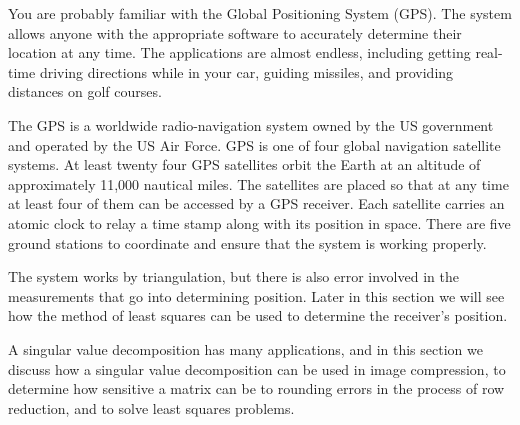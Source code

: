  \label{sec:pseudoinverses}

\vspace*{-17 pt}

\vspace*{13 pt}


You are probably familiar with the Global Positioning System (GPS). The system allows anyone with the appropriate software to accurately determine their location at any time. The applications are almost endless, including getting real-time driving directions while in your car, guiding missiles, and providing distances on golf courses. 

The GPS is a worldwide radio-navigation system owned by the US government and operated by the US Air Force. GPS is one of four global navigation satellite systems. At least twenty four GPS satellites orbit the Earth at an altitude of approximately 11,000 nautical miles. The satellites are placed so that at any time at least four of them can be accessed by a GPS receiver. Each satellite carries an atomic clock to relay a time stamp along with its position in space. There are five ground stations to coordinate and ensure that the system is working properly. 

The system works by triangulation, but there is also error involved in the measurements that go into determining position. Later in this section we will see how the method of least squares can be used to determine the receiver's position.


 A singular value decomposition has many applications, and in this section we discuss how a singular value decomposition can be used in image compression, to determine how sensitive a matrix can be to rounding errors in the process of row reduction, and to solve least squares problems.  


